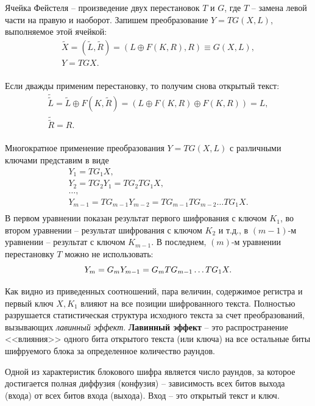 Ячейка Фейстеля -- произведение двух перестановок $T$ и $G$, где $T$ -- замена левой части на правую и наоборот. Запишем преобразование $Y=TG(X,L)$, выполняемое этой ячейкой:
\[
  \begin{array}{l}
    \tilde{X} = (\tilde{L}, \tilde{R}) = (L \oplus F(K,R), R) \equiv G(X, L), \\
    Y = TGX. \\
  \end{array}
\]

Если дважды применим перестановку, то получим снова открытый текст:
\[
    \begin{array}{l}
        \tilde{\tilde{L}} = \tilde{L} \oplus F(K, \tilde{R}) = (L \oplus F(K,R) \oplus F(K,R)) = L, \\
        \tilde{\tilde{R}} = R.\\
    \end{array}
\]

Многократное применение преобразования $Y=TG(X,L)$ с различными ключами представим в виде
\[
  \begin{array}{l}
    Y_1 = T G_1 X,\\
    Y_2 = T G_2 Y_1 = T G_2 T G_1 X, \\
    \ldots, \\
    Y_{m-1} = T G_{m-1} Y_{m-2} = T G_{m-1} T G_{m-2} \ldots T G_1 X.\\
  \end{array}
\]
В первом уравнении показан результат первого шифрования с ключом $K_{1}$, во втором уравнении -- результат шифрования с ключом $K_{2}$ и т.д., в $(m-1)$-м уравнении -- результат с ключом $K_{m-1}$. В последнем, $(m)$-м уравнении перестановку $T$ можно не использовать:
\[
   Y_{m}= G_{m} Y_{m-1} = G_{m} T G_{m-1} \ldots T G_{1} X.\\
\]

Как видно из приведенных соотношений, пара величин, содержимое регистра и первый ключ $X, K_{1}$ влияют на все позиции шифрованного текста. Полностью разрушается статистическая структура исходного текста за счет преобразований, вызывающих \emph{лавинный эффект}.  \textbf{Лавинный эффект} -- это распространение <<влияния>> одного бита открытого текста (или ключа) на все остальные биты шифруемого блока за определенное количество раундов.

Одной из характеристик блокового шифра является число раундов, за которое достигается полная диффузия (конфузия) -- зависимость всех битов выхода (входа) от всех битов входа (выхода). Вход -- это открытый текст и ключ.

